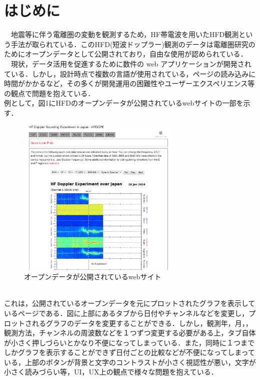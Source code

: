 \section{はじめに}

　地震等に伴う電離圏の変動を観測するため，HF帯電波を用いたHFD観測という手法が取られている．このHFD(短波ドップラー)観測のデータは電離圏研究のためにオープンデータとして公開されており，自由な使用が認められている．\cite{hfd_report}\\
　現状，データ活用を促進するために数件の web アプリケーションが開発されている．しかし，設計時点で複数の言語が使用されている，ページの読み込みに時間がかかるなど，その多くが開発運用の困難性やユーザーエクスペリエンス等の観点で問題を抱えている．\\
 例として，図1にHFDのオープンデータが公開されているwebサイトの一部を示す．\cite{hfd_link}\\
 \begin{figure}[ht]
   \centering
   \includegraphics[width=80mm]{fig/websc.png}
   \caption{オープンデータが公開されているwebサイト}
 \end{figure}\\
 これは，公開されているオープンデータを元にプロットされたグラフを表示しているページである．図に上部にあるタブから日付やチャンネルなどを変更し，プロットされるグラフのデータを変更することができる．しかし，観測年，月，，観測方法，チャンネルの周波数などを１つずつ変更する必要がある上，タブ自体が小さく押しづらいとかなり不便になってしまっている．また，同時に１つまでしかグラフを表示することができず日付ごとの比較などが不便になってしまっている，上部のボタンが背景と文字のコントラストが小さく視認性が悪い，文字が小さく読みづらい等，UI，UX上の観点で様々な問題を抱えている．\\
